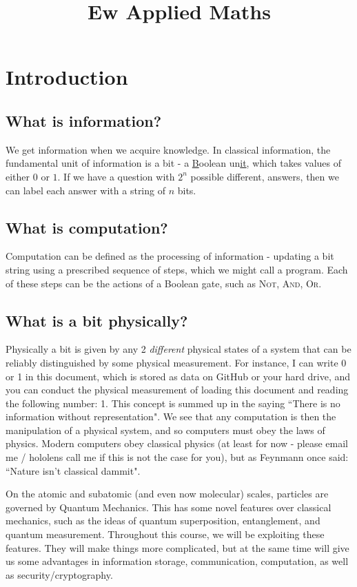 \documentclass[10pt,a4paper]{article}
\title{Ew Applied Maths}
\begin{document}
\maketitle
\setcounter{section}{-1}

\section{Introduction}
\subsection*{What is information?}
We get information when we acquire knowledge. In classical information, the fundamental unit of information is a bit - a \underline{B}oolean un\underline{it}, which takes values of either $0$ or $1$. If we have a question with $2^n$ possible different, answers, then we can label each answer with a string of $n$ bits.

\subsection*{What is computation?}
Computation can be defined as the processing of information - updating a bit string using a prescribed sequence of steps, which we might call a program. Each of these steps can be the actions of a Boolean gate, such as \textsc{Not}, \textsc{And}, \textsc{Or}.

\subsection*{What is a bit physically?}
Physically a bit is given by any 2 \textit{different} physical states of a system that can be reliably distinguished by some physical measurement. For instance, I can write 0 or 1 in this document, which is stored as data on GitHub or your hard drive, and you can conduct the physical measurement of loading this document and reading the following number: 1. This concept is summed up in the saying ``There is no information without representation". We see that any computation is then the manipulation of a physical system, and so computers must obey the laws of physics. Modern computers obey classical physics (at least for now - please email me / hololens call me if this is not the case for you), but as Feynmann once said: ``Nature isn't classical dammit".

On the atomic and subatomic (and even now molecular) scales, particles are governed by Quantum Mechanics. This has some novel features over classical mechanics, such as the ideas of quantum superposition, entanglement, and quantum measurement. Throughout this course, we will be exploiting these features. They will make things more complicated, but at the same time will give us some advantages in information storage, communication, computation, as well as security/cryptography.
\end{document}
